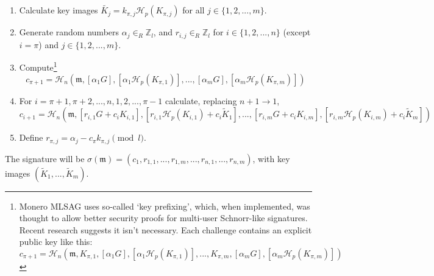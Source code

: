 \begin{enumerate}
	
	\item Calculate key images \(\tilde{K_j} = k_{\pi, j} \mathcal{H}_p(K_{\pi, j})\) for all \(j \in \{1, 2, ..., m\}\).
	
	\item Generate random numbers  \(\alpha_j \in_R \mathbb{Z}_l\), and \(r_{i, j} \in_R \mathbb{Z}_l\) for \(i \in \{1, 2, ..., n\}\) (except \(i = \pi\)) and \(j \in \{1, 2, ..., m\}\).
	
	\item Compute\footnote{Monero MLSAG uses so-called `key prefixing', which, when implemented, was thought to allow better security proofs for multi-user Schnorr-like signatures. Recent research suggests it isn't necessary. \cite{key-prefix-paper} Each challenge contains an explicit public key like this:
	\[
	c_{\pi+1} = \mathcal{H}_n(\mathfrak{m}, K_{\pi, 1}, [\alpha_1 G], [\alpha_1 \mathcal{H}_p(K_{\pi, 1})], ..., K_{\pi, m}, [\alpha_m G], [\alpha_m \mathcal{H}_p(K_{\pi, m})])
	\]} 
	\[
	c_{\pi+1} = \mathcal{H}_n(\mathfrak{m}, [\alpha_1 G], [\alpha_1 \mathcal{H}_p(K_{\pi, 1})], ..., [\alpha_m G], [\alpha_m \mathcal{H}_p(K_{\pi, m})])
	\]
	
	\item For \(i = \pi+1, \pi+2, ..., n, 1, 2, ..., \pi-1\) calculate, replacing \(n + 1 \rightarrow 1\),\vspace{.2cm}
	\[  c_{i+1} = \mathcal{H}_n(\mathfrak{m}, [r_{i, 1} G + c_i K_{i, 1}], [r_{i, 1} \mathcal{H}_p(K_{i, 1}) + c_i \tilde{K}_1], 
	..., [r_{i, m} G + c_i K_{i, m}], [r_{i, m} \mathcal{H}_p(K_{i, m}) + c_i \tilde{K}_m])  \] 
	
	
	\item Define \(r_{\pi, j} = \alpha_j - c_\pi k_{\pi, j} \pmod l\).
	
\end{enumerate}

The signature will be \(\sigma(\mathfrak{m}) = (c_1, r_{1, 1}, ..., r_{1, m}, ..., r_{n, 1}, ..., r_{n, m}) \), with key images $(\tilde{K}_1, ...,  \tilde{K}_m)$.


